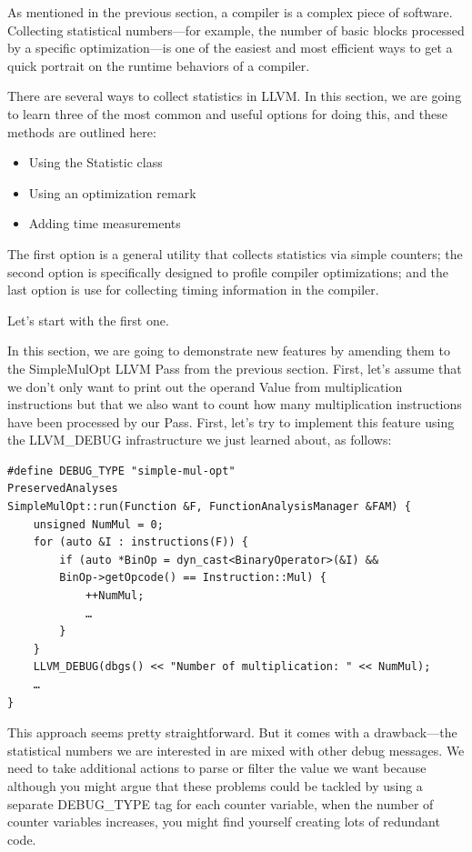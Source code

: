 
As mentioned in the previous section, a compiler is a complex piece of software. Collecting statistical numbers—for example, the number of basic blocks processed by a specific optimization—is one of the easiest and most efficient ways to get a quick portrait on the runtime behaviors of a compiler.

There are several ways to collect statistics in LLVM. In this section, we are going to learn three of the most common and useful options for doing this, and these methods are outlined here:

\begin{itemize}
\item Using the Statistic class
\item Using an optimization remark
\item Adding time measurements
\end{itemize}

The first option is a general utility that collects statistics via simple counters; the second option is specifically designed to profile compiler optimizations; and the last option is use for collecting timing information in the compiler.

Let's start with the first one.


In this section, we are going to demonstrate new features by amending them to the SimpleMulOpt LLVM Pass from the previous section. First, let's assume that we don't only want to print out the operand Value from multiplication instructions but that we also want to count how many multiplication instructions have been processed by our Pass. First, let's try to implement this feature using the LLVM\_DEBUG infrastructure we just learned about, as follows:

\begin{lstlisting}[style=styleCXX]
#define DEBUG_TYPE "simple-mul-opt"
PreservedAnalyses
SimpleMulOpt::run(Function &F, FunctionAnalysisManager &FAM) {
	unsigned NumMul = 0;
	for (auto &I : instructions(F)) {
		if (auto *BinOp = dyn_cast<BinaryOperator>(&I) &&
		BinOp->getOpcode() == Instruction::Mul) {
			++NumMul;
			…
		}
	}
	LLVM_DEBUG(dbgs() << "Number of multiplication: " << NumMul);
	…
}
\end{lstlisting}

This approach seems pretty straightforward. But it comes with a drawback—the statistical numbers we are interested in are mixed with other debug messages. We need to take additional actions to parse or filter the value we want because although you might argue that these problems could be tackled by using a separate DEBUG\_TYPE tag for each counter variable, when the number of counter variables increases, you might find yourself creating lots of redundant code.

